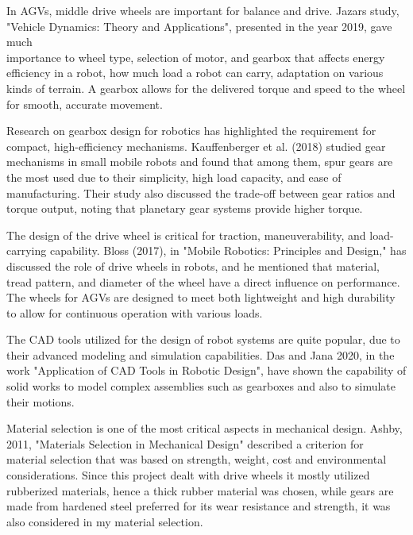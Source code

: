 \documentclass[../../main]{subfiles}
\begin{document}
In AGVs, middle drive wheels are important for balance and drive.
Jazar\textquotesingle s study\cite{jazar2019road}, "Vehicle Dynamics: Theory and
Applications", presented in the year 2019, gave much \\importance to wheel
type, selection of motor, and gearbox that affects energy efficiency in
a robot, how much load a robot can carry, adaptation on various kinds of
terrain. A gearbox allows for the delivered torque and speed to the
wheel for smooth, accurate movement.

Research on gearbox design for robotics has highlighted the requirement
for compact, high-efficiency mechanisms. Kauffenberger et al. (2018)
studied gear mechanisms in small mobile robots and found that among
them, spur gears are the most used due to their simplicity, high load
capacity, and ease of manufacturing. Their study also discussed the
trade-off between gear ratios and torque output, noting that planetary
gear systems provide higher torque.

The design of the drive wheel is critical for traction, maneuverability,
and load-carrying capability. Bloss (2017), in "Mobile Robotics:
Principles and Design," has discussed the role of drive wheels in
robots, and he mentioned that material, tread pattern, and diameter of
the wheel have a direct influence on performance. The wheels for AGVs
are designed to meet both lightweight and high durability to allow for
continuous operation with various loads.

The CAD tools utilized for the design of robot systems are quite
popular, due to their advanced modeling and simulation capabilities. Das
and Jana 2020, in the work "Application of CAD Tools in Robotic Design",
have shown the capability of solid works to model complex assemblies
such as gearboxes and also to simulate their motions.

Material selection is one of the most critical aspects in mechanical
design. Ashby\cite{ashby1994materials}, 2011, "Materials Selection in Mechanical Design"
described a criterion for material selection that was based on strength,
weight, cost and environmental considerations. Since this project dealt
with drive wheels it mostly utilized rubberized materials, hence a thick
rubber material was chosen, while gears are made from hardened steel
preferred for its wear resistance and strength, it was also considered
in my material selection.

\end{document}
